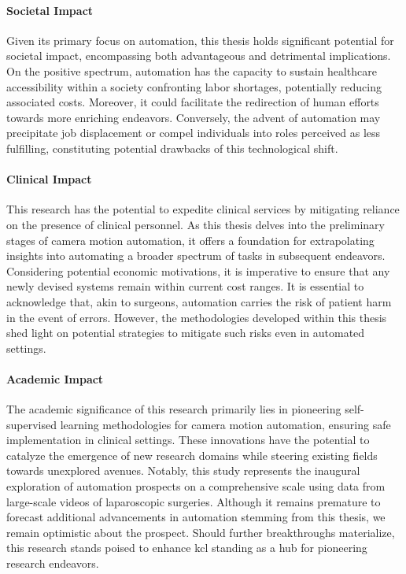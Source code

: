 \paragraph{Societal Impact} Given its primary focus on automation, this thesis holds significant potential for societal impact, encompassing both advantageous and detrimental implications. On the positive spectrum, automation has the capacity to sustain healthcare accessibility within a society confronting labor shortages, potentially reducing associated costs. Moreover, it could facilitate the redirection of human efforts towards more enriching endeavors. Conversely, the advent of automation may precipitate job displacement or compel individuals into roles perceived as less fulfilling, constituting potential drawbacks of this technological shift.

\paragraph{Clinical Impact} This research has the potential to expedite clinical services by mitigating reliance on the presence of clinical personnel. As this thesis delves into the preliminary stages of camera motion automation, it offers a foundation for extrapolating insights into automating a broader spectrum of tasks in subsequent endeavors. Considering potential economic motivations, it is imperative to ensure that any newly devised systems remain within current cost ranges. It is essential to acknowledge that, akin to surgeons, automation carries the risk of patient harm in the event of errors. However, the methodologies developed within this thesis shed light on potential strategies to mitigate such risks even in automated settings.

\paragraph{Academic Impact} The academic significance of this research primarily lies in pioneering self-supervised learning methodologies for camera motion automation, ensuring safe implementation in clinical settings. These innovations have the potential to catalyze the emergence of new research domains while steering existing fields towards unexplored avenues. Notably, this study represents the inaugural exploration of automation prospects on a comprehensive scale using data from large-scale videos of laparoscopic surgeries. Although it remains premature to forecast additional advancements in automation stemming from this thesis, we remain optimistic about the prospect. Should further breakthroughs materialize, this research stands poised to enhance \gls{kcl} standing as a hub for pioneering research endeavors.
